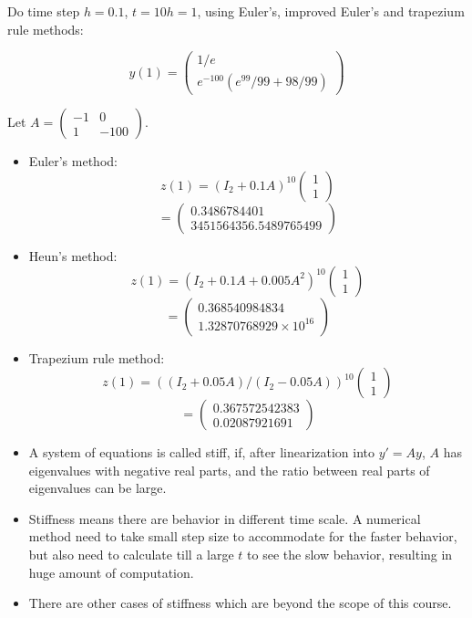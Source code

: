 \documentclass{article} %
\theoremstyle{break}
\begin{document}
Do time step $h=0.1$, $t=10h=1$, using Euler's, improved Euler's and trapezium rule methods:

\[y(1)=\left(\begin{array}{c}1/e\\e^{-100}(e^{99}/99+98/99)\end{array}\right)\]

Let $A=\left(\begin{array}{cc} -1 & 0 \\ 1 & -100\end{array}\right)$.\\

\begin{itemize}
\item Euler's method: 
\[z(1)=(I_2+0.1A)^{10}\left(\begin{array}{c}1\\1\end{array}\right)\]
\[=\left(\begin{array}{c}0.3486784401\\ 3451564356.5489765499 \end{array}\right)\]


\item Heun's method:
\[z(1)=(I_2+0.1A+0.005A^2)^{10}\left(\begin{array}{c}1\\1\end{array}\right)\]
\[=\left(\begin{array}{c}0.368540984834\\ 1.32870768929\times 10^{16} \end{array}\right)\]

\item Trapezium rule method:
\[z(1)=((I_2+0.05A)/(I_2-0.05A))^{10}\left(\begin{array}{c}1\\1\end{array}\right)\]
\[=\left(\begin{array}{c}0.367572542383\\ 0.02087921691 \end{array}\right)\]

\end{itemize}




\begin{itemize}
\item A system of equations is called stiff, if, after linearization into $y'=Ay$, $A$ has eigenvalues with negative real parts, and the ratio between real parts of eigenvalues can be large.
\item Stiffness means there are behavior in different time scale. A numerical method need to take small step size to accommodate for the faster behavior, but also need to calculate till a large $t$ to see the slow behavior, resulting in huge amount of computation.
\item There are other cases of stiffness which are beyond the scope of this course.
\end{itemize}
\end{document}
